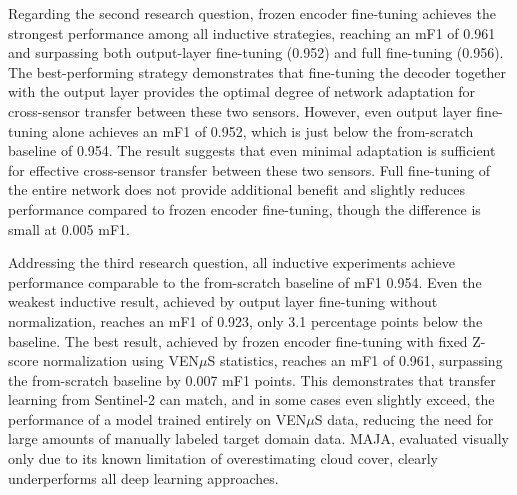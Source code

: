 Regarding the second research question, frozen encoder fine-tuning achieves the strongest performance among all inductive strategies, reaching an mF1 of 0.961 and surpassing both output-layer fine-tuning (0.952) and full fine-tuning (0.956). The best-performing strategy demonstrates that fine-tuning the decoder together with the output layer provides the optimal degree of network adaptation for cross-sensor transfer between these two sensors. However, even output layer fine-tuning alone achieves an mF1 of 0.952, which is just below the from-scratch baseline of 0.954. The result suggests that even minimal adaptation is sufficient for effective cross-sensor transfer between these two sensors. Full fine-tuning of the entire network does not provide additional benefit and slightly reduces performance compared to frozen encoder fine-tuning, though the difference is small at 0.005 mF1.

Addressing the third research question, all inductive experiments achieve performance comparable to the from-scratch baseline of mF1 0.954. Even the weakest inductive result, achieved by output layer fine-tuning without normalization, reaches an mF1 of 0.923, only 3.1 percentage points below the baseline. The best result, achieved by frozen encoder fine-tuning with fixed Z-score normalization using VEN$\mu$S statistics, reaches an mF1 of 0.961, surpassing the from-scratch baseline by 0.007 mF1 points. This demonstrates that transfer learning from Sentinel-2 can match, and in some cases even slightly exceed, the performance of a model trained entirely on VEN$\mu$S data, reducing the need for large amounts of manually labeled target domain data. MAJA, evaluated visually only due to its known limitation of overestimating cloud cover, clearly underperforms all deep learning approaches.
